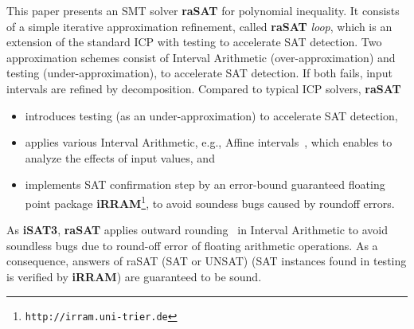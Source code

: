 \documentclass[runningheads,a4paper,oribibl]{llncs}
\begin{document}
This paper presents an SMT solver {\bf raSAT} for polynomial inequality. 
It consists of a simple iterative approximation refinement, called {\bf raSAT} {\em loop}, 
which is an extension of the standard ICP with testing to accelerate SAT detection. 
Two approximation schemes consist of Interval Arithmetic (over-approximation) and 
testing (under-approximation), to accelerate SAT detection. 
If both fails, input intervals are refined by decomposition. 
%
Compared to typical ICP solvers, {\bf raSAT} 
\begin{itemize}
\item introduces testing (as an under-approximation) to accelerate SAT detection, 
\item applies various Interval Arithmetic, e.g., Affine intervals~\cite{Messine_extensionsof,Ngoc:2009:ORE:1685167.1685421,VanKhanh201227}, 
which enables to analyze the effects of input values, and 
\item implements SAT confirmation step by an error-bound guaranteed floating point package {\bf iRRAM}\footnote{%
\tt http://irram.uni-trier.de}, to avoid soundess bugs caused by roundoff errors. 
\end{itemize}
As \textbf{iSAT3}, \textbf{raSAT} applies outward rounding~\cite{Hickey:2001:IAP:502102.502106} in Interval Arithmetic to avoid soundless bugs due to round-off error of floating arithmetic operations. As a consequence, answers of raSAT (SAT or UNSAT) (SAT instances found in testing is verified by \textbf{iRRAM}) are guaranteed to be sound.
\end{document}
